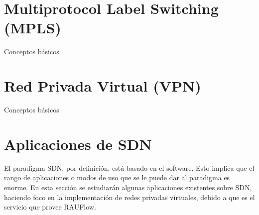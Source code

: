 



\section{Multiprotocol Label Switching (MPLS)}
Conceptos básicos

\section{Red Privada Virtual (VPN)}
Conceptos básicos

\section{Aplicaciones de SDN}
El paradigma SDN, por definición, está basado en el software. Esto implica que el rango de aplicaciones o modos de uso que se le puede dar al paradigma es enorme. En esta sección se estudiarán algunas aplicaciones existentes sobre SDN, haciendo foco en la implementación de redes privadas virtuales, debido a que es el servicio que provee RAUFlow.
